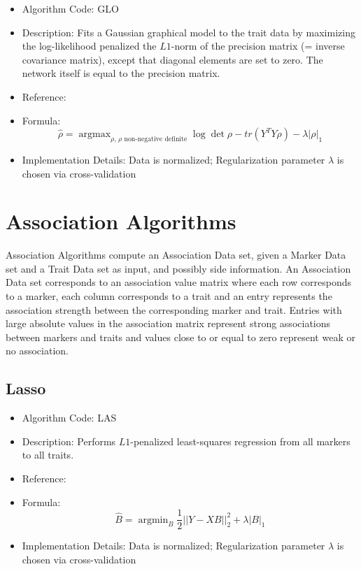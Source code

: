\documentclass{article}
\newcommand{\argmin}{\operatorname{argmin}}
\newcommand{\argmax}{\operatorname{argmax}}
\begin{document}
\begin{itemize}
\item Algorithm Code: GLO
\item Description: Fits a Gaussian graphical model to the trait data by maximizing the log-likelihood penalized the $L1$-norm of the precision matrix (= inverse covariance matrix), except that diagonal elements are set to zero. The network itself is equal to the precision matrix. 
\item Reference: \cite{GLasso}
\item Formula:
\begin{equation*}
\hat{\rho} = \argmax_{\rho\text{, $\rho$ non-negative definite}} \log \det \rho - tr(Y^TY\rho) - \lambda|\rho|_1
\end{equation*}
\item Implementation Details: Data is normalized; Regularization parameter $\lambda$ is chosen via cross-validation
\end{itemize}

\section{Association Algorithms}

Association Algorithms compute an Association Data set, given a Marker Data set and a Trait Data set as input, and possibly side information. An Association Data set corresponds to an association value matrix where each row corresponds to a marker, each column corresponds to a trait and an entry represents the association strength between the corresponding marker and trait. Entries with large absolute values in the association matrix represent strong associations between markers and traits and values close to or equal to zero represent weak or no association.

\subsection{Lasso}

\begin{itemize}
\item Algorithm Code: LAS
\item Description: Performs $L1$-penalized least-squares regression from all markers to all traits.
\item Reference: \cite{Lasso}
\item Formula:
\begin{equation*}
\hat{B} = \argmin_{B} \frac{1}{2}||Y - XB||_2^2 + \lambda|B|_1
\end{equation*}
\item Implementation Details: Data is normalized; Regularization parameter $\lambda$ is chosen via cross-validation
\end{itemize}
\end{document}
